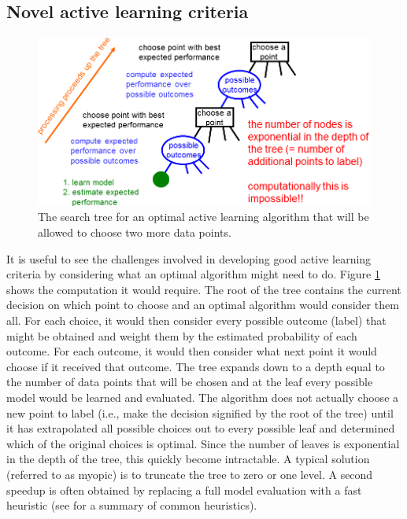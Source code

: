 \documentclass[prd,nofootbib,floatfix,11pt,tightenlines]{revtex4}
\begin{document}
\subsection{Novel active learning criteria}

\begin{figure}[t]
\centerline{\includegraphics[scale=0.4]{searchtree.png}}
\caption{The search tree for an optimal active learning algorithm that will
  be allowed to choose two more data points.}
\label{fig:searchtree}
\end{figure}

It is useful to see the challenges involved in developing good active
learning criteria by considering what an optimal algorithm might need to
do.  Figure \ref{fig:searchtree} shows the computation it would require.
The root of the tree contains the current decision on which point to choose
and an optimal algorithm would consider them all.  For each choice, it
would then consider every possible outcome (label) that might be obtained
and weight them by the estimated probability of each outcome.  For each
outcome, it would then consider what next point it would choose if it
received that outcome.  The tree expands down to a depth equal to the
number of data points that will be chosen and at the leaf every possible
model would be learned and evaluated.  
The algorithm does not actually choose a new point to label (i.e., make the
decision signified by the root of the tree) until
it has extrapolated all possible choices out to every possible leaf 
and determined which of the original choices is optimal.
Since the number of leaves is
exponential in the depth of the tree, this quickly become intractable.  A
typical solution (referred to as myopic) is to truncate the tree to zero or
one level.  A second speedup is often obtained by replacing a full model
evaluation with a fast heuristic (see \cite{Settles09} for a summary of
common heuristics).
\end{document}
